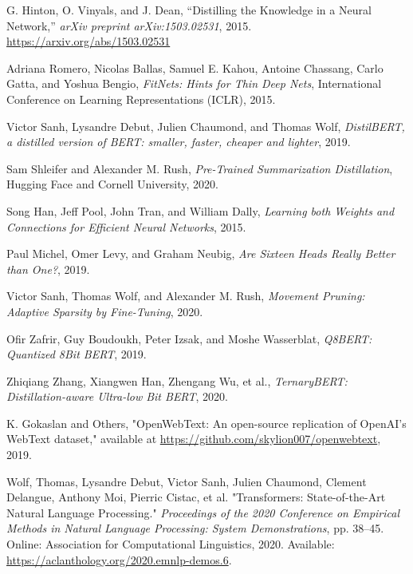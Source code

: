 \documentclass{article}
\begin{document}
    \begin{thebibliography}{9}

        G. Hinton, O. Vinyals, and J. Dean,
        ``Distilling the Knowledge in a Neural Network,''
        \emph{arXiv preprint arXiv:1503.02531}, 2015.
        \url{https://arxiv.org/abs/1503.02531}

        Adriana Romero, Nicolas Ballas, Samuel E. Kahou, Antoine Chassang, Carlo Gatta, and Yoshua Bengio,
        \emph{FitNets: Hints for Thin Deep Nets},
        International Conference on Learning Representations (ICLR), 2015.

        Victor Sanh, Lysandre Debut, Julien Chaumond, and Thomas Wolf,
        \emph{DistilBERT, a distilled version of BERT: smaller, faster, cheaper and lighter},
        2019.

        Sam Shleifer and Alexander M. Rush,
        \emph{Pre-Trained Summarization Distillation},
        Hugging Face and Cornell University,
        2020.

        Song Han, Jeff Pool, John Tran, and William Dally,
        \emph{Learning both Weights and Connections for Efficient Neural Networks},
        2015.

        Paul Michel, Omer Levy, and Graham Neubig,
        \emph{Are Sixteen Heads Really Better than One?},
        2019.

        Victor Sanh, Thomas Wolf, and Alexander M. Rush,
        \emph{Movement Pruning: Adaptive Sparsity by Fine-Tuning},
        2020.

        Ofir Zafrir, Guy Boudoukh, Peter Izsak, and Moshe Wasserblat,
        \emph{Q8BERT: Quantized 8Bit BERT},
        2019.

        Zhiqiang Zhang, Xiangwen Han, Zhengang Wu, et al.,
        \emph{TernaryBERT: Distillation-aware Ultra-low Bit BERT},
        2020.

        K. Gokaslan and Others,
        "OpenWebText: An open-source replication of OpenAI's WebText dataset,"
        available at \url{https://github.com/skylion007/openwebtext}, 2019.

        Wolf, Thomas, Lysandre Debut, Victor Sanh, Julien Chaumond, Clement Delangue, Anthony Moi, Pierric Cistac, et al.
        "Transformers: State-of-the-Art Natural Language Processing."
        \textit{Proceedings of the 2020 Conference on Empirical Methods in Natural Language Processing: System Demonstrations},
        pp. 38–45. Online: Association for Computational Linguistics, 2020.
        Available: \url{https://aclanthology.org/2020.emnlp-demos.6}.


\end{thebibliography}
\end{document}

